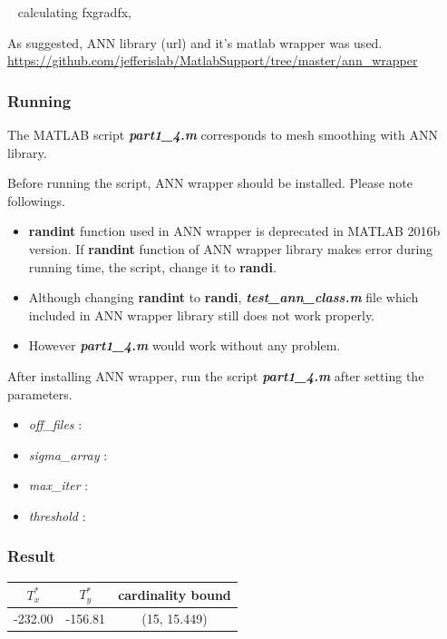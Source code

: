 \documentclass[paper=a4, fontsize=11pt]{scrartcl} %
\numberwithin{equation}{section} %
\numberwithin{figure}{section} %
\numberwithin{table}{section} %
\newcommand{\filename}[1]{\textbf{\textit{#1}}}
\newcommand{\funcname}[1]{\textbf{#1}}
\begin{document}
~ calculating fxgradfx, ~ 

As suggested, ANN library (url) and it's matlab wrapper was used. 
\url{https://github.com/jefferislab/MatlabSupport/tree/master/ann_wrapper}

\subsubsection{Running}

The MATLAB script \filename{part1_4.m} corresponds to mesh smoothing with ANN library. 

Before running the script, ANN wrapper should be installed. Please note followings. 

\begin{itemize}
\item \funcname{randint} function used in ANN wrapper is deprecated in MATLAB 2016b version. If \funcname{randint} function of ANN wrapper library makes error during running time, the script, change it to \funcname{randi}.
\item Although changing \funcname{randint} to \funcname{randi}, \filename{test_ann_class.m} file which included in ANN wrapper library still does not work properly. 
\item However \filename{part1_4.m} would work without any problem. 
\end{itemize}

After installing ANN wrapper, run the script \filename{part1_4.m} after setting the parameters. 

\begin{itemize}
\item \textit{off_files} : 
\item \textit{sigma_array} : 
\item \textit{max_iter} :
\item \textit{threshold} :  
\end{itemize}


\subsubsection{Result}

\begin{table}[h]
 \label{tab:title} 
\centering
\begin{tabular}{| c | c | c | }
\hline 
$T_{x}^*$		&	$T_{y}^*$		&	cardinality bound \\
\hline  
-232.00		&	-156.81		&	(15, 15.449) \\
\hline
\end{tabular}
\end{table}
\end{document}
